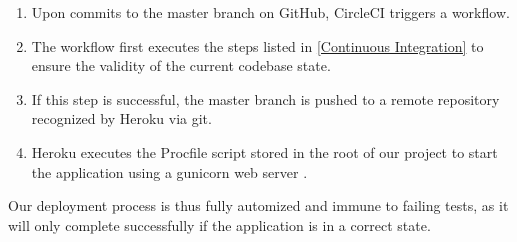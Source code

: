 \documentclass[main.tex]{subfiles}
\begin{document}
\begin{enumerate}
	\item Upon commits to the master branch on GitHub, CircleCI triggers a workflow.
	\item The workflow first executes the steps listed in \ref{Continuous Integration} to ensure the validity of the current codebase state.
	\item If this step is successful, the master branch is pushed to a remote repository recognized by Heroku via git.
	\item Heroku executes the Procfile script stored in the root of our project to start the application using a gunicorn web server \cite{Gunicorn}.
\end{enumerate}

Our deployment process is thus fully automized and immune to failing tests, as it will only complete successfully if the application is in a correct state.
\end{document}
